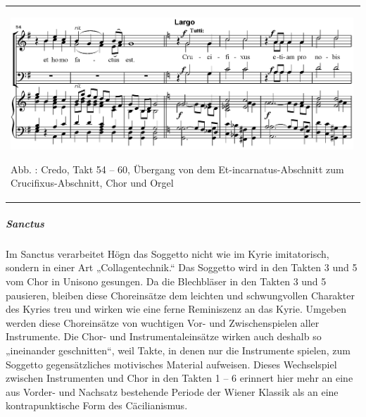\documentclass[a4paper]{article}
\newcounter{Abb}
\renewcommand\theAbb{\arabic{Abb}}
\begin{document}
\begin{center}
\tablefirsthead{}
\tablehead{}
\tabletail{}
\tablelasttail{}
\begin{supertabular}{m{13.070001cm}}

\includegraphics[width=12.887cm,height=4.953cm]{pictures/zulassungsarbeit-img120.png}

Abb. \stepcounter{Abb}{\theAbb}: Credo, Takt 54 – 60, Übergang von dem
Et-incarnatus-Abschnitt zum Crucifixus-Abschnitt, Chor und Orgel

\\
\end{supertabular}
\end{center}
\subparagraph{Sanctus}
Im Sanctus verarbeitet Högn das Soggetto nicht wie im Kyrie
imitatorisch, sondern in einer Art „Collagentechnik.“ Das Soggetto wird
in den Takten 3 und 5 vom Chor in Unisono gesungen. Da die Blechbläser
in den Takten 3 und 5 pausieren, bleiben diese Choreinsätze dem
leichten und schwungvollen Charakter des Kyries treu und wirken wie
eine ferne Reminiszenz an das Kyrie. Umgeben werden diese Choreinsätze
von wuchtigen Vor- und Zwischenspielen aller Instrumente. Die Chor- und
Instrumentaleinsätze wirken auch deshalb so „ineinander geschnitten“,
weil Takte, in denen nur die Instrumente spielen, zum Soggetto
gegensätzliches motivisches Material aufweisen. Dieses Wechselspiel
zwischen Instrumenten und Chor in den Takten 1 – 6 erinnert hier mehr
an eine aus Vorder- und Nachsatz bestehende Periode der Wiener Klassik
als an eine kontrapunktische Form des Cäcilianismus.
\end{document}
